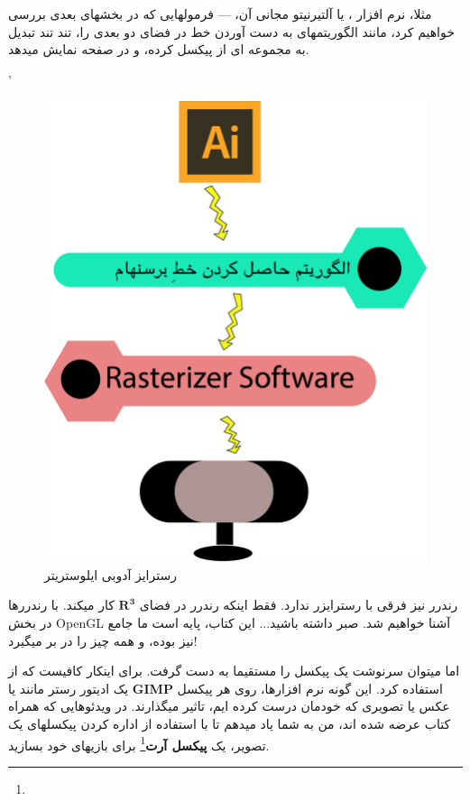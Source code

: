 \documentclass[14pt,a4paper]{memoir}
\begin{document}
	 
	 مثلا، نرم افزار ، یا آلتیرنیتو مجانی آن، \textbf{} --- فرمولهایی که در بخشهای بعدی بررسی خواهیم کرد، مانند الگوریتمهای به دست آوردن خط در فضای دو بعدی را، تند تند تبدیل به مجموعه ای از پیکسل کرده، و در صفحه نمایش میدهد.
	 
	 '
	 
\begin{figure}[H]
	\centering
	\includegraphics[scale=1]{Rasterizer}
	\caption{رسترایز آدوبی ایلوستریتر}
\end{figure}
	 
	 
	 رندرر نیز فرقی با رسترایزر ندارد. فقط اینکه رندرر در فضای $ \mathbf{R^3} $  کار میکند. با رندررها در بخش OpenGL آشنا خواهیم شد. صبر داشته باشید... این کتاب، پایه است ما جامع نیز بوده، و همه چیز را در بر میگیرد!
	 
	 اما میتوان سرنوشت یک پیکسل را مستقیما به دست گرفت. برای اینکار کافیست که از یک ادیتور رستر مانند \textbf{} یا \textbf{GIMP} استفاده کرد. این گونه نرم افزارها، روی هر پیکسل عکس یا تصویری که خودمان درست کرده ایم، تاثیر میگذارند. در ویدئوهایی که همراه کتاب عرضه شده اند، من به شما یاد میدهم تا با استفاده از اداره کردن پیکسلهای یک تصویر، یک \textbf{پیکسل آرت}\footnote{} برای بازیهای خود بسازید.	 
	 
\end{document}

